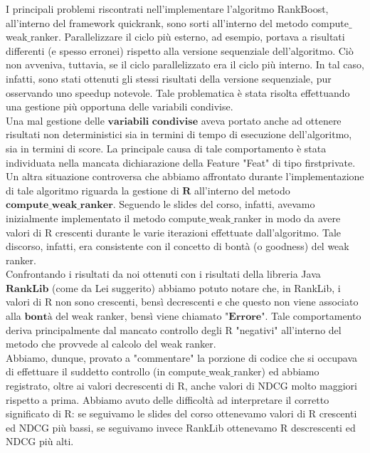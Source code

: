 I principali problemi riscontrati nell'implementare l'algoritmo RankBoost, all'interno del framework quickrank, sono sorti all'interno del metodo compute$\_$weak$\_$ranker. Parallelizzare il ciclo più esterno, ad esempio, portava a risultati differenti (e spesso erronei) rispetto alla versione sequenziale dell'algoritmo. Ciò non avveniva, tuttavia, se il ciclo parallelizzato era il ciclo più interno. In tal caso, infatti, sono stati ottenuti gli stessi risultati della versione sequenziale, pur osservando uno speedup notevole. Tale problematica è stata risolta effettuando una gestione più opportuna delle variabili condivise.\\
Una mal gestione delle $\textbf{variabili condivise}$ aveva portato anche ad ottenere risultati non deterministici sia in termini di tempo di esecuzione dell'algoritmo, sia in termini di score. La principale causa di tale comportamento è stata individuata nella mancata dichiarazione della Feature "Feat" di tipo firstprivate.\\
Un altra situazione controversa che abbiamo affrontato durante l'implementazione di tale algoritmo riguarda la gestione di $\textbf{R}$ all'interno del metodo $\textbf{compute}\_\textbf{weak}\_\textbf{ranker}$. Seguendo le slides del corso, infatti, avevamo inizialmente implementato il metodo compute$\_$weak$\_$ranker in modo da avere valori di R crescenti durante le varie iterazioni effettuate dall'algoritmo. Tale discorso, infatti, era consistente con il concetto di bontà (o goodness) del weak ranker.\\
Confrontando i risultati da noi ottenuti con i risultati della libreria Java $\textbf{RankLib}$ (come da Lei suggerito) abbiamo potuto notare che, in RankLib, i valori di R non sono crescenti, bensì decrescenti e che questo non viene associato alla $\textbf{bontà}$ del weak ranker, bensì viene chiamato $\textbf{"Errore"}$. Tale comportamento deriva principalmente dal mancato controllo degli R "negativi" all'interno del metodo che provvede al calcolo del weak ranker.\\
Abbiamo, dunque, provato a "commentare" la porzione di codice che si occupava di effettuare il suddetto controllo (in compute$\_$weak$\_$ranker) ed abbiamo registrato, oltre ai valori decrescenti di R, anche valori di NDCG molto maggiori rispetto a prima. Abbiamo avuto delle difficoltà ad interpretare il corretto significato di R: se seguivamo le slides del corso ottenevamo valori di R crescenti ed NDCG più bassi, se seguivamo invece RankLib ottenevamo R descrescenti ed NDCG più alti.\\
		
	
